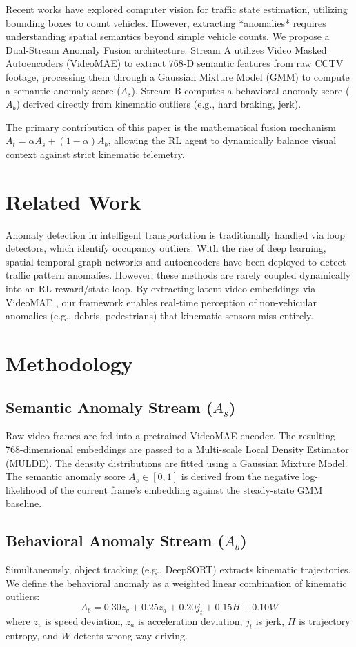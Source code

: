 \documentclass{ieeeaccess}
\begin{document}
Recent works have explored computer vision for traffic state estimation, utilizing bounding boxes to count vehicles. However, extracting *anomalies* requires understanding spatial semantics beyond simple vehicle counts. We propose a Dual-Stream Anomaly Fusion architecture. Stream A utilizes Video Masked Autoencoders (VideoMAE) to extract 768-D semantic features from raw CCTV footage, processing them through a Gaussian Mixture Model (GMM) to compute a semantic anomaly score ($A_s$). Stream B computes a behavioral anomaly score ($A_b$) derived directly from kinematic outliers (e.g., hard braking, jerk).

The primary contribution of this paper is the mathematical fusion mechanism $A_t = \alpha A_s + (1-\alpha) A_b$, allowing the RL agent to dynamically balance visual context against strict kinematic telemetry.

\section{Related Work}
\label{sec:related_work}
Anomaly detection in intelligent transportation is traditionally handled via loop detectors, which identify occupancy outliers. With the rise of deep learning, spatial-temporal graph networks and autoencoders have been deployed to detect traffic pattern anomalies. However, these methods are rarely coupled dynamically into an RL reward/state loop. By extracting latent video embeddings via VideoMAE \cite{placeholder8}, our framework enables real-time perception of non-vehicular anomalies (e.g., debris, pedestrians) that kinematic sensors miss entirely.

\section{Methodology}
\label{sec:methodology}

\subsection{Semantic Anomaly Stream ($A_s$)}
Raw video frames are fed into a pretrained VideoMAE encoder. The resulting 768-dimensional embeddings are passed to a Multi-scale Local Density Estimator (MULDE). The density distributions are fitted using a Gaussian Mixture Model. The semantic anomaly score $A_s \in [0,1]$ is derived from the negative log-likelihood of the current frame's embedding against the steady-state GMM baseline.

\subsection{Behavioral Anomaly Stream ($A_b$)}
Simultaneously, object tracking (e.g., DeepSORT) extracts kinematic trajectories. We define the behavioral anomaly as a weighted linear combination of kinematic outliers:
$$A_b = 0.30 z_v + 0.25 z_a + 0.20 j_t + 0.15 H + 0.10 W$$
where $z_v$ is speed deviation, $z_a$ is acceleration deviation, $j_t$ is jerk, $H$ is trajectory entropy, and $W$ detects wrong-way driving.
\end{document}
